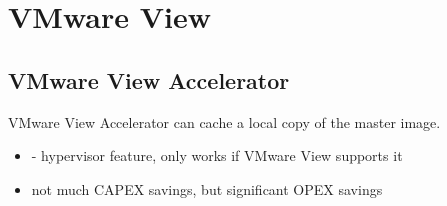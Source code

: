 \section{VMware View}

\subsection{VMware View Accelerator}

VMware View Accelerator can cache a local copy of the master image.

\begin{itemize}

\item - hypervisor feature, only works if VMware View supports it
\item not much CAPEX savings, but significant OPEX savings

\end{itemize}
